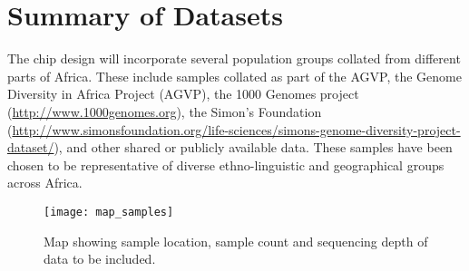 \section{Summary of Datasets}
The chip design will incorporate several population groups collated from different parts of Africa. These include samples collated as part of the AGVP, the Genome Diversity in Africa Project (AGVP), the 1000 Genomes project (\href{http://www.1000genomes.org}{http://www.1000genomes.org}), the Simon’s Foundation (\href{http://www.simonsfoundation.org/life-sciences/simons-genome-diversity-project-dataset/}{http://www.simonsfoundation.org/life-sciences/simons-genome-diversity-project-dataset/}), and other shared or publicly available data. These samples have been chosen to be representative of diverse ethno-linguistic and geographical groups across Africa.


\begin{figure}[h]
\caption{Map showing sample location, sample count and sequencing depth of data to be included.}
\centering
\texttt{[image: map\_samples]}
\end{figure}